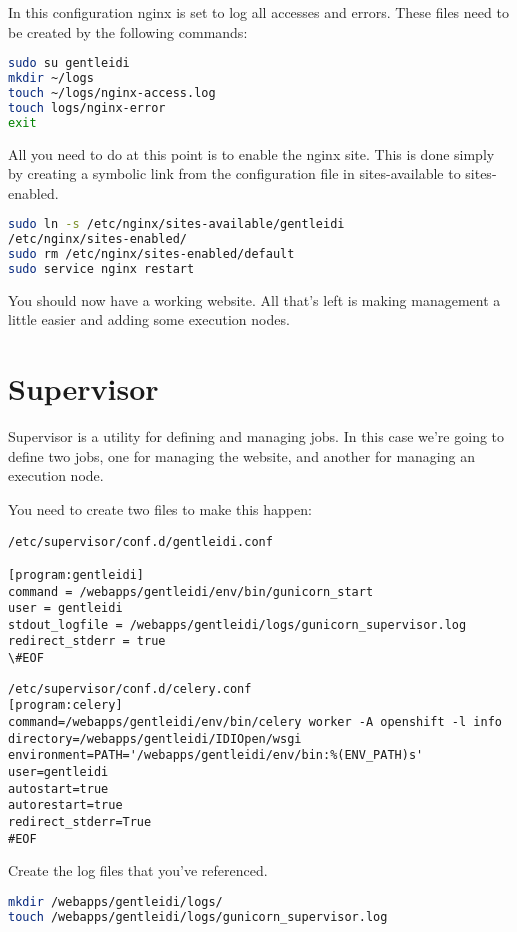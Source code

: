 In this configuration nginx is set to log all accesses and errors. These
files need to be created by the following commands:

\begin{lstlisting}[language=bash]
sudo su gentleidi
mkdir ~/logs
touch ~/logs/nginx-access.log
touch logs/nginx-error
exit
\end{lstlisting}

All you need to do at this point is to enable the nginx site. This is
done simply by creating a symbolic link from the configuration file in
sites-available to sites-enabled.

\begin{lstlisting}[language=bash]
sudo ln -s /etc/nginx/sites-available/gentleidi
/etc/nginx/sites-enabled/
sudo rm /etc/nginx/sites-enabled/default
sudo service nginx restart
\end{lstlisting}

You should now have a working website. All that's left
is making management a little easier and adding some execution nodes.

\section{Supervisor}
Supervisor is a utility for defining and managing jobs. In this case
we're going to define two jobs, one for managing the
website, and another for managing an execution node.

You need to create two files to make this happen:

\begin{verbatim}
/etc/supervisor/conf.d/gentleidi.conf

[program:gentleidi]
command = /webapps/gentleidi/env/bin/gunicorn_start
user = gentleidi
stdout_logfile = /webapps/gentleidi/logs/gunicorn_supervisor.log
redirect_stderr = true
\#EOF
\end{verbatim}

\begin{verbatim}
/etc/supervisor/conf.d/celery.conf
[program:celery]
command=/webapps/gentleidi/env/bin/celery worker -A openshift -l info
directory=/webapps/gentleidi/IDIOpen/wsgi
environment=PATH='/webapps/gentleidi/env/bin:%(ENV_PATH)s'
user=gentleidi
autostart=true
autorestart=true
redirect_stderr=True
#EOF
\end{verbatim}

Create the log files that you've referenced.
\begin{lstlisting}[language=bash]
mkdir /webapps/gentleidi/logs/
touch /webapps/gentleidi/logs/gunicorn_supervisor.log
\end{lstlisting}

